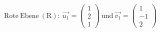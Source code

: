 \documentclass[preview]{standalone}
\begin{document}
\begin{center}
$\mathrm{Rote \: Ebene \: (R):} \: \vec{u_1} = \begin{pmatrix} 1 \\ 2 \\ 1 \end{pmatrix} \: \mathrm{und} \: \vec{v_1} = \begin{pmatrix} 1 \\ -1 \\ 2 \end{pmatrix}$
\end{center}
\end{document}
